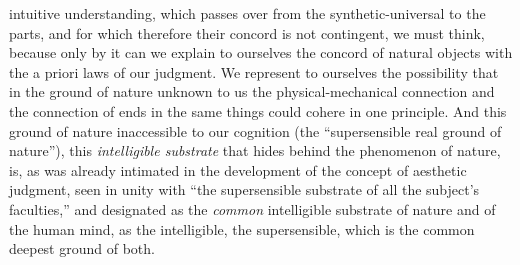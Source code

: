 intuitive understanding, which passes over from the
synthetic-universal to the parts, and for which therefore their concord
is not contingent, we must think, because only by it can we explain to
ourselves the concord of natural objects with the a priori laws of our
judgment. We represent to ourselves the possibility that in the ground
of nature unknown to us the physical-mechanical connection and the
connection of ends in the same things could cohere in one principle.
And this ground of nature inaccessible to our cognition (the
``supersensible real ground of nature''), this \emph{intelligible
substrate} that hides behind the phenomenon of nature, is, as was
already intimated in the development of the concept of aesthetic
judgment, seen in unity with ``the supersensible substrate of all the
subject's faculties,'' and designated as the \emph{common} intelligible
substrate of nature and of the human mind, as the intelligible, the
supersensible, which is the common deepest ground of both.

